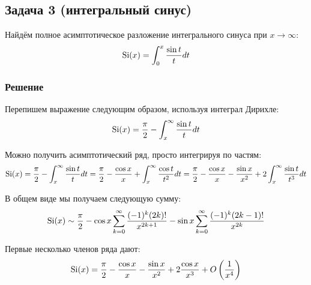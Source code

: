 \documentclass[a4paper,12pt]{article}
\begin{document}
\subsection*{Задача 3 (интегральный синус)}

Найдём полное асимптотическое разложение интегрального синуса при
$x\to\infty$:
\[
{\rm Si}(x)=\int_{0}^{x}\frac{\sin t}{t}dt
\]



\subsubsection*{Решение}

Перепишем выражение следующим образом, используя интеграл Дирихле:
\[
{\rm Si}(x)=\frac{\pi}{2}-\int_{x}^{\infty}\frac{\sin t}{t}dt
\]

\noindent
Можно получить асимптотический ряд, просто интегрируя по частям:
\[
{\rm Si}(x)=\frac{\pi}{2}-\int_{x}^{\infty}\frac{\sin t}{t}dt=\frac{\pi}{2}-\frac{\cos x}{x}+\int_{x}^{\infty}\frac{\cos t}{t^{2}}dt=\frac{\pi}{2}-\frac{\cos x}{x}-\frac{\sin x}{x^{2}}+2\int_{x}^{\infty}\frac{\sin t}{t^{3}}dt
\]

\noindent
В общем виде мы получаем следующую сумму:
\[
{\rm Si}(x)\sim\frac{\pi}{2}-\cos x\sum_{k=0}^{\infty}\frac{(-1)^{k}(2k)!}{x^{2k+1}}-\sin x\sum_{k=0}^{\infty}\frac{(-1)^{k}(2k-1)!}{x^{2k}}
\]

\noindent
Первые несколько членов ряда дают:
\[
{\rm Si}(x)=\frac{\pi}{2}-\frac{\cos x}{x}-\frac{\sin x}{x^{2}}+2\frac{\cos x}{x^{3}}+O\left(\frac{1}{x^{4}}\right)
\]
\end{document}
